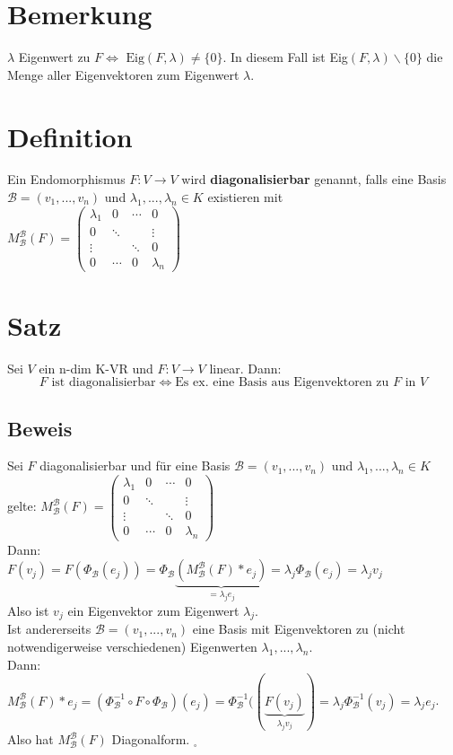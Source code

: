 \documentclass{scrbook}
\begin{document}
\section{Bemerkung}
$\lambda$ Eigenwert zu $F \Leftrightarrow$ $\text{Eig}(F,\lambda) \neq \{0\}$. In diesem Fall ist Eig$(F,\lambda)\backslash \{0\}$ die Menge aller Eigenvektoren zum Eigenwert $\lambda$.
\section{Definition}
Ein Endomorphismus $F:V\rightarrow V$ wird \textbf{diagonalisierbar} genannt, falls eine Basis $\mathscr{B} = (v_1,...,v_n)$ und $\lambda_1,...,\lambda_n \in K$ existieren mit $M^\mathscr{B}_\mathscr{B}(F)=\left(\begin{array}{cccc}
\lambda_1&0&\cdots&0\\
0&\ddots&&\vdots\\
\vdots&&\ddots&0\\
0&\cdots&0&\lambda_n
\end{array}
\right)$
\section{Satz}
Sei $V$ ein n-dim K-VR und $F:V \rightarrow V$ linear. Dann:\[F\text{ ist diagonalisierbar} \Leftrightarrow \text{Es ex. eine Basis aus Eigenvektoren zu } F \text{ in } V\]
\subsection*{Beweis}
Sei $F$ diagonalisierbar und für eine Basis $\mathscr{B}=(v_1,...,v_n)$ und $\lambda_1,...,\lambda_n \in K$ gelte: $M^\mathscr{B}_\mathscr{B}(F)=\left(\begin{array}{cccc}
\lambda_1&0&\cdots&0\\
0&\ddots&&\vdots\\
\vdots&&\ddots&0\\
0&\cdots&0&\lambda_n
\end{array}
\right)$\\
Dann:\\
$F(v_j) = F(\Phi_\mathscr{B} (e_j)) = \Phi_\mathscr{B}\underbrace{(M^\mathscr{B}_\mathscr{B}(F)*e_j)}_{=\lambda_je_j} = \lambda_j\Phi_\mathscr{B}(e_j)=\lambda_jv_j$\\
Also ist $v_j$ ein Eigenvektor zum Eigenwert $\lambda_j$.\\
Ist andererseits $\mathscr{B}=(v_1,...,v_n)$ eine Basis mit Eigenvektoren zu (nicht notwendigerweise verschiedenen) Eigenwerten $\lambda_1,...,\lambda_n$.\\Dann:\\
$M^\mathscr{B}_\mathscr{B}(F)*e_j=(\Phi_\mathscr{B}^{-1} \circ F \circ \Phi_\mathscr{B})(e_j) = \Phi_\mathscr{B}^{-1} ((\underbrace{F(v_j)}_{\lambda_jv_j})=\lambda_j \Phi_\mathscr{B}^{-1}(v_j) = \lambda_je_j$.\\
Also hat $M^\mathscr{B}_\mathscr{B}(F)$ Diagonalform. $_\square$
\end{document}
